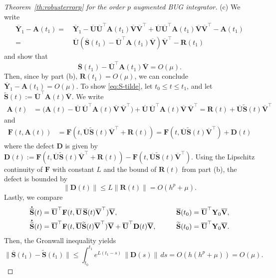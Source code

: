 \documentclass[preprint,runningheads]{svjour3}
\newcommand*{\dt}[1]{ \accentset{\mbox{\large\bfseries .}}{#1}}
\def\wt{\widetilde}
\def\wt{\overline}
\newcommand\bfA{{\mathbf A}}
\newcommand\bfD{{\mathbf D}}
\newcommand\bfF{{\mathbf F}}
\newcommand\bfR{{\mathbf R}}
\newcommand\bfS{{\mathbf S}}
\newcommand\bfU{{\mathbf U}}
\newcommand\bfV{{\mathbf V}}
\newcommand\bfY{{\mathbf Y}}
\begin{document}
\begin{proof}[Theorem~\ref{th:robusterrorp} for the order $p$ augmented BUG integrator]
(c) We write 
\begin{align*}
    \wt \bfY_1 - \bfA(t_1) =\,& \wt \bfY_1 - \wt \bfU\wt \bfU^\top \bfA(t_1) \wt \bfV \wt \bfV^\top + \wt \bfU\wt \bfU^\top \bfA(t_1) \wt \bfV \wt \bfV^\top - \bfA(t_1)\\
=\,&\wt \bfU (\wt \bfS(t_1) -  \wt \bfU^\top \bfA(t_1) \wt \bfV) \wt \bfV^\top - \bfR(t_1) 
\end{align*}
and show that
\begin{equation}\label{eq:S-tilde}
\wt \bfS(t_1) -  \wt \bfU^\top \bfA(t_1) \wt \bfV=O(\mu).
\end{equation}
Then, since by part (b), $\bfR(t_1) = O(\mu)$, we can conclude $\wt \bfY_1 - \bfA(t_1) = O(\mu)$. To show \eqref{eq:S-tilde}, let $t_0\le t \le t_1$, and let $ \widetilde\bfS(t) := \wt \bfU^\top \bfA(t)  \wt \bfV$.
		We write
		\begin{equation*}
		\begin{aligned}
		\bfA(t) 
		&=  \bigl( \bfA(t) - \wt \bfU \,\wt \bfU^\top \bfA(t) \wt \bfV \,\wt \bfV^\top \bigr) 
         + \wt \bfU \,\wt \bfU^\top \bfA(t) \wt \bfV \,\wt \bfV^\top 
		=  \textbf{R}(t)+ \wt \bfU \widetilde\bfS(t) \wt \bfV^\top
		\end{aligned}
		\end{equation*}
        and
        \begin{equation*}		\begin{aligned}
		\bfF(t, \bfA(t)) 
		&= \bfF(t, \wt \bfU \widetilde\bfS(t) \wt \bfV^\top + \textbf{R}(t) ) 
         = \bfF(t, \wt \bfU \widetilde\bfS(t) \wt \bfV^\top) + \bfD(t)
		\end{aligned}
		\end{equation*}
		where the defect $\bfD$ is given by
		$
		\bfD(t) := \bfF(t, \wt \bfU \widetilde\bfS(t) \wt \bfV^\top + \textbf{R}(t)) - \bfF(t, \wt \bfU \widetilde\bfS(t) \wt \bfV^\top).
		$
		Using the Lipschitz continuity of $\bfF$ with constant $L$ and the bound of $\bfR(t)$ from part (b), the defect is bounded by
		$$
		\|  \bfD(t) \| \le L \| \textbf{R}(t) \| =O(h^p+\mu).
		$$
		Lastly, we compare
		\begin{equation*}
		\begin{aligned}
		&\dt{\wt\bfS}(t) = \wt \bfU^\top \bfF(t, \wt \bfU\, \wt\bfS(t) \wt \bfV^\top)  \wt \bfV, 
		\qquad
		&\wt\bfS(t_0) = \wt \bfU^\top \bfY_0  \wt \bfV,
        \\
        &\dt{\widetilde\bfS}(t) = \wt \bfU^\top \bfF(t, \wt \bfU \widetilde\bfS(t) \wt \bfV^\top)  \wt \bfV + \wt \bfU^\top \bfD(t)  \wt \bfV, 
		\qquad
		&\widetilde\bfS(t_0) = \wt \bfU^\top \bfY_0  \wt \bfV.
		\end{aligned}
		\end{equation*}
		Then, the Gronwall inequality yields
		$$
		\|  \wt\bfS(t_1) - \widetilde \bfS(t_1) \| 
		\leq \int_{t_0}^{t_1} e^{L(t_1-s)} \, \| \bfD(s) \| \, ds
		=O(h(h^p+\mu))= O(\mu).
		$$
	

\end{proof}
\end{document}
